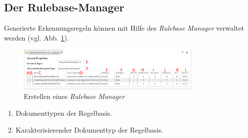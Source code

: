 \subsection{Der Rulebase-Manager}
\label{sec:rbmanager}

Generierte Erkennungsregeln können mit Hilfe des \textit{Rulebase Manager} verwaltet werden (vgl. Abb. \ref{silif-rulebase_manager}).

\begin{figure}[H]
\centering
\includegraphics[width=0.8\textwidth]{recognitionrules/graphics/silift-rulebase_manager.png}
\caption{Erstellen eines \textit{Rulebase Manager}}
\label{silif-rulebase_manager}
\end{figure}

\begin{enumerate}
	\item Dokumenttypen der Regelbasis.
	\item Karakterisierender Dokumenttyp der Regelbasis.
\end{enumerate}

